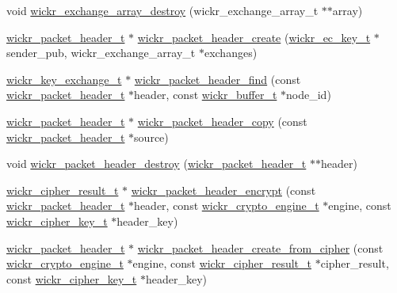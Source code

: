 \begin{DoxyCompactItemize}
\item 
void \hyperlink{group__wickr__protocol_gadc1e5f5836bc09c1d6b8d6203d02a0eb}{wickr\+\_\+exchange\+\_\+array\+\_\+destroy} (wickr\+\_\+exchange\+\_\+array\+\_\+t $\ast$$\ast$array)
\item 
\hyperlink{structwickr__packet__header}{wickr\+\_\+packet\+\_\+header\+\_\+t} $\ast$ \hyperlink{group__wickr__protocol_ga8ad519d1b5dc3960c426db9a556404e1}{wickr\+\_\+packet\+\_\+header\+\_\+create} (\hyperlink{structwickr__ec__key}{wickr\+\_\+ec\+\_\+key\+\_\+t} $\ast$sender\+\_\+pub, wickr\+\_\+exchange\+\_\+array\+\_\+t $\ast$exchanges)
\item 
\hyperlink{structwickr__key__exchange}{wickr\+\_\+key\+\_\+exchange\+\_\+t} $\ast$ \hyperlink{group__wickr__protocol_gac9fab2b713e40a607735bcce0befee96}{wickr\+\_\+packet\+\_\+header\+\_\+find} (const \hyperlink{structwickr__packet__header}{wickr\+\_\+packet\+\_\+header\+\_\+t} $\ast$header, const \hyperlink{structwickr__buffer}{wickr\+\_\+buffer\+\_\+t} $\ast$node\+\_\+id)
\item 
\hyperlink{structwickr__packet__header}{wickr\+\_\+packet\+\_\+header\+\_\+t} $\ast$ \hyperlink{group__wickr__protocol_ga5ffb8763c9ebf2ad7322d507d117d7ba}{wickr\+\_\+packet\+\_\+header\+\_\+copy} (const \hyperlink{structwickr__packet__header}{wickr\+\_\+packet\+\_\+header\+\_\+t} $\ast$source)
\item 
void \hyperlink{group__wickr__protocol_gacb41cb9ad58871f01d8660e3ab115f4e}{wickr\+\_\+packet\+\_\+header\+\_\+destroy} (\hyperlink{structwickr__packet__header}{wickr\+\_\+packet\+\_\+header\+\_\+t} $\ast$$\ast$header)
\item 
\hyperlink{structwickr__cipher__result}{wickr\+\_\+cipher\+\_\+result\+\_\+t} $\ast$ \hyperlink{group__wickr__protocol_ga3495440a494c33a38ce4154b400e9809}{wickr\+\_\+packet\+\_\+header\+\_\+encrypt} (const \hyperlink{structwickr__packet__header}{wickr\+\_\+packet\+\_\+header\+\_\+t} $\ast$header, const \hyperlink{structwickr__crypto__engine}{wickr\+\_\+crypto\+\_\+engine\+\_\+t} $\ast$engine, const \hyperlink{structwickr__cipher__key}{wickr\+\_\+cipher\+\_\+key\+\_\+t} $\ast$header\+\_\+key)
\item 
\hyperlink{structwickr__packet__header}{wickr\+\_\+packet\+\_\+header\+\_\+t} $\ast$ \hyperlink{group__wickr__protocol_ga53ff33471ac0c4c7e3feedfcce520639}{wickr\+\_\+packet\+\_\+header\+\_\+create\+\_\+from\+\_\+cipher} (const \hyperlink{structwickr__crypto__engine}{wickr\+\_\+crypto\+\_\+engine\+\_\+t} $\ast$engine, const \hyperlink{structwickr__cipher__result}{wickr\+\_\+cipher\+\_\+result\+\_\+t} $\ast$cipher\+\_\+result, const \hyperlink{structwickr__cipher__key}{wickr\+\_\+cipher\+\_\+key\+\_\+t} $\ast$header\+\_\+key)

\end{DoxyCompactItemize}
